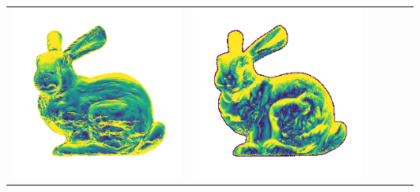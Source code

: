 \begin{center}
\begin{tabularx}{\linewidth}{@{}Y@{}Y@{}Y@{}Y@{}Y@{}Y@{}}
\includegraphics[width=\linewidth]{semisynthetic/20150514_14_yu_err.png} &
\includegraphics[width=\linewidth]{semisynthetic/20150514_14_dpsn_err.png} &

\end{tabularx}
\end{center}
